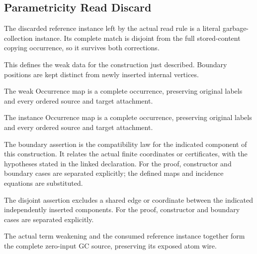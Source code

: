 \subsection{Parametricity Read Discard}
The discarded reference instance left by the actual read rule is a literal garbage-collection instance. Its complete match is disjoint from the full stored-content copying occurrence, so it survives both corrections.

This defines the weak data for the construction just described. Boundary positions are kept distinct from newly inserted internal vertices.
\par{}

The weak Occurrence map is a complete occurrence, preserving original labels and every ordered source and target attachment.
\par{}

The instance Occurrence map is a complete occurrence, preserving original labels and every ordered source and target attachment.
\par{}

The boundary assertion is the compatibility law for the indicated component of this construction. It relates the actual finite coordinates or certificates, with the hypotheses stated in the linked declaration.
For the proof, constructor and boundary cases are separated explicitly; the defined maps and incidence equations are substituted.
\par{}

The disjoint assertion excludes a shared edge or coordinate between the indicated independently inserted components.
For the proof, constructor and boundary cases are separated explicitly.
\par{}

The actual term weakening and the consumed reference instance together form the complete zero-input GC source, preserving its exposed atom wire.
\par{}

